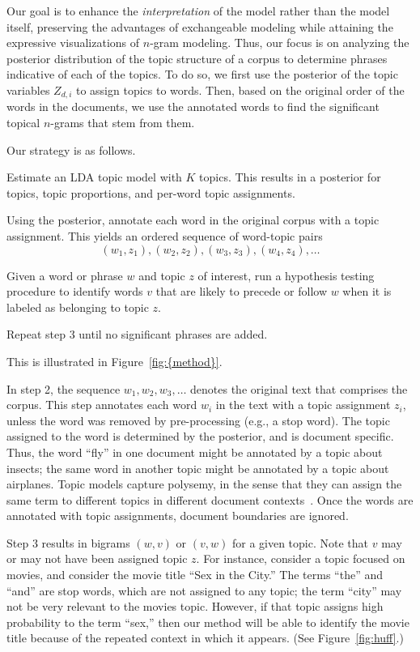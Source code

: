 \documentclass[11pt]{article}
\newenvironment{packed_enumerate}{
  \begin{enumerate}
    \setlength{\topsep}{0pt}
    \setlength{\itemsep}{6pt}
    \setlength{\parskip}{0pt}
    \setlength{\parsep}{0pt}
}\end{enumerate}
\begin{document}
Our goal is to enhance the \textit{interpretation} of the model rather
than the model itself, preserving the advantages of exchangeable
modeling while attaining the expressive visualizations of $n$-gram
modeling.  Thus, our focus is on analyzing the posterior distribution
of the topic structure of a corpus to determine phrases indicative of
each of the topics.  To do so, we first use the posterior of the topic
variables $Z_{d,i}$ to assign topics to words.  Then, based on the
original order of the words in the documents, we use the annotated
words to find the significant topical $n$-grams that stem from them.

Our strategy is as follows.
\begin{packed_enumerate}
\item Estimate an LDA topic model with $K$ topics.  This results in a
  posterior for topics, topic proportions, and per-word topic
  assignments.

\item Using the posterior, annotate each word in the original corpus
  with a topic assignment.  This yields an ordered sequence of
  word-topic pairs
  \[(w_1,z_1), (w_2,z_2), (w_3,z_3), (w_4,z_4) , \ldots\]

\item Given a word or phrase $w$ and topic $z$ of interest, run a
  hypothesis testing procedure to identify words $v$ that are likely
  to precede or follow $w$ when it is labeled as belonging to topic
  $z$.

\item Repeat step 3 until no significant phrases are added.
\end{packed_enumerate}
This is illustrated in {Figure~\ref{fig:{method}}}.

In step 2, the sequence $w_1, w_2, w_3,\ldots $ denotes the original
text that comprises the corpus.  This step annotates each word $w_i$
in the text with a topic assignment $z_i$, unless the word was removed
by pre-processing (e.g., a stop word).  The topic assigned to the word
is determined by the posterior, and is document specific.  Thus, the
word ``fly'' in one document might be annotated by a topic about
insects; the same word in another topic might be annotated by a topic
about airplanes.  Topic models capture polysemy, in the sense that
they can assign the same term to different topics in different
document contexts~\cite{Griffiths:2006}.  Once the words are annotated
with topic assignments, document boundaries are ignored.

Step 3 results in bigrams $(w,v)$ or $(v,w)$ for a given topic.  Note
that $v$ may or may not have been assigned topic $z$. For instance,
consider a topic focused on movies, and consider the movie title ``Sex
in the City.''  The terms ``the'' and ``and'' are stop words, which
are not assigned to any topic; the term ``city'' may not be very
relevant to the movies topic.  However, if that topic assigns high
probability to the term ``sex,'' then our method will be able to
identify the movie title because of the repeated context in which it
appears.  (See Figure~\ref{fig:huff}.)
\end{document}
